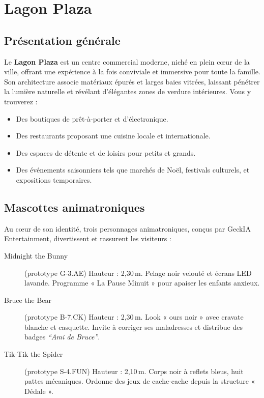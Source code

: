 \section{Lagon Plaza} %

\subsection{Présentation générale}
Le \textbf{Lagon Plaza} est un centre commercial moderne, niché en plein cœur de la ville, offrant une expérience à la fois conviviale et immersive pour toute la famille. Son architecture associe matériaux épurés et larges baies vitrées, laissant pénétrer la lumière naturelle et révélant d’élégantes zones de verdure intérieures. Vous y trouverez :
\begin{itemize}
  \item Des boutiques de prêt-à-porter et d’électronique.
  \item Des restaurants proposant une cuisine locale et internationale.
  \item Des espaces de détente et de loisirs pour petits et grands.
  \item Des événements saisonniers tels que marchés de Noël, festivals culturels, et expositions temporaires.
\end{itemize}

\subsection{Mascottes animatroniques}
Au cœur de son identité, trois personnages animatroniques, conçus par GeckIA Entertainment, divertissent et rassurent les visiteurs :
\begin{description}
  \item[Midnight the Bunny] (prototype G-3.AE)
    Hauteur : 2,30\,m. Pelage noir velouté et écrans LED lavande. Programme « La Pause Minuit » pour apaiser les enfants anxieux.
  \item[Bruce the Bear] (prototype B-7.CK)  
    Hauteur : 2,30\,m. Look « ours noir » avec cravate blanche et casquette. Invite à corriger ses maladresses et distribue des badges \emph{“Ami de Bruce”}.
  \item[Tik-Tik the Spider] (prototype S-4.FUN)  
    Hauteur : 2,10\,m. Corps noir à reflets bleus, huit pattes mécaniques. Ordonne des jeux de cache-cache depuis la structure « Dédale ».
\end{description}

